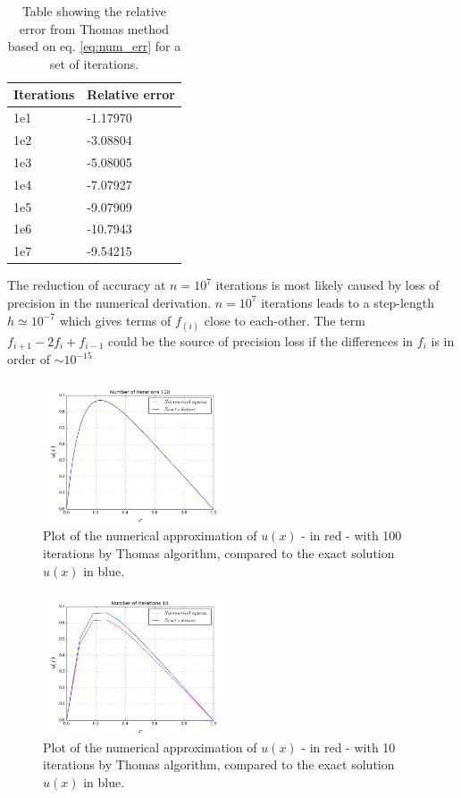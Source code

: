 \documentclass[twoside,twocolumn]{article}
\begin{document}
\begin{table}[htp]
\centering
\begin{tabular}{|l|l|} \hline
Iterations & Relative error\\ \hline
1e1 & -1.17970\\
1e2 & -3.08804\\
1e3 & -5.08005\\
1e4 & -7.07927\\
1e5 & -9.07909\\
1e6 & -10.7943\\
1e7 & -9.54215\\ \hline
\end{tabular}
\caption{Table showing the relative error from Thomas method based on eq. \ref{eq:num_err} for a set of iterations.}\label{tbl:error}
\end{table}


The reduction of accuracy at $n=10^7$ iterations  is most likely caused by loss of precision in the numerical derivation. $n=10^7$ iterations leads to a step-length $h\simeq 10^{-7}$ which gives terms of $f_(i)$ close to each-other. The term $f_{i+1}-2f_i+f_{i-1}$ could be the source of precision loss if the differences in $f_i$ is in order of $\sim10^{-15}$

\begin{figure}[htp]
\includegraphics[width=0.5\textwidth]{figures/b-run1e2.png} 
\caption{Plot of the numerical approximation of $u(x)$ - in red - with 100 iterations by Thomas algorithm, compared to the exact solution $u(x)$ in blue.} \label{fig:Thomas1E2}
\end{figure}

\begin{figure}[htp]
\includegraphics[width=0.5\textwidth]{figures/b-run10.png} 
\caption{Plot of the numerical approximation of $u(x)$ - in red - with 10 iterations by Thomas algorithm, compared to the exact solution $u(x)$ in blue.} \label{fig:Thomas10}
\end{figure}
\end{document}
